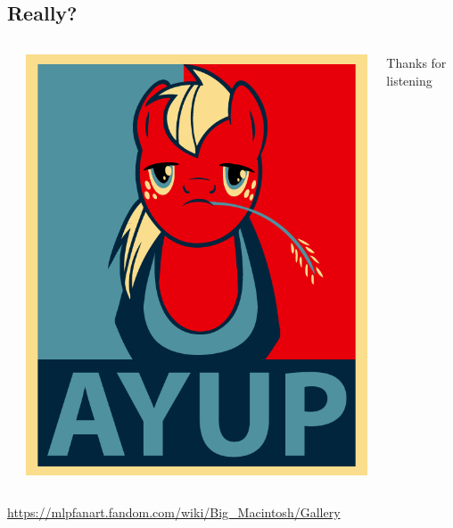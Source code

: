 \documentclass{beamer}
\begin{document}
\subsection{Really?}
\begin{frame}{}
  \begin{columns}
  \begin{column}{0.22\textwidth}

  \end{column}
  \begin{column}{0.5\textwidth}
    \includegraphics[width=\textwidth]{../pony_big_mac_ayup}
  \end{column}
  \begin{column}{0.22\textwidth}
    Thanks for listening
  \end{column}
  \end{columns}

  \centering

  \medskip

  \small \href{https://mlpfanart.fandom.com/wiki/Big_Macintosh/Gallery}{https://mlpfanart.fandom.com/wiki/Big\_Macintosh/Gallery}

\end{frame}
\end{document}

